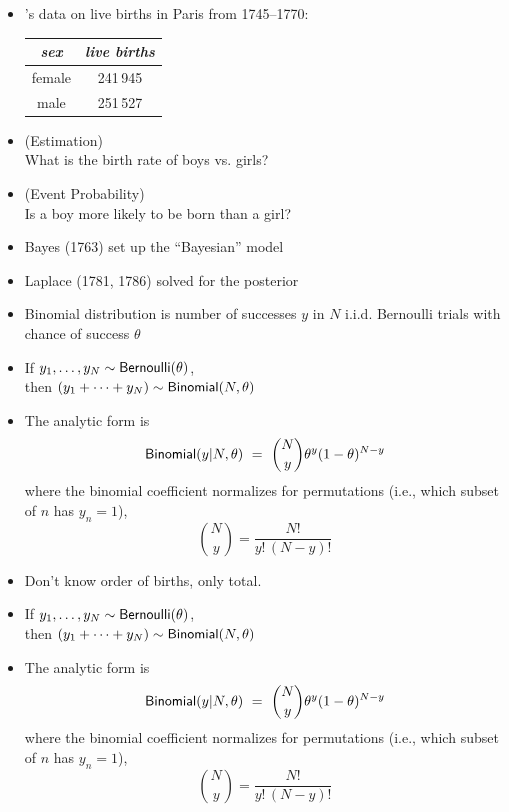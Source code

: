 \documentclass[10pt]{report}
\begin{document}


\begin{itemize}
\item {}'s data on live births in Paris from 1745--1770:
\vspace*{-4pt}
\begin{center}\small
\begin{tabular}{c|c}
{\slshape sex} & {\slshape live births}
\\ \hline
female & 241\,945
\\
male & 251\,527
\end{tabular}
\end{center}
\item {} (Estimation)
\\
What is the birth rate of boys vs. girls?

\item {} (Event Probability)
\\
Is a boy more likely to be born than a girl?
%
\item Bayes (1763) set up the ``Bayesian'' model
\item Laplace (1781, 1786) solved for the posterior
\end{itemize}


%
\begin{itemize}
\item Binomial distribution is number of successes $y$ in $N$ 
i.i.d. Bernoulli trials with chance of success $\theta$
\item If $y_1,\ldots,y_N\sim \text{\sf Bernoulli}(\theta)$, 
\\[4pt] then $(y_1 + \cdots + y_N) \sim \text{\sf Binomial}(N,\theta)$
\item The analytic form is
\[
\text{\sf Binomial}(y|N,\theta) 
\ = \ \binom{N}{y} \theta^{y} (1 - \theta)^{N-y}
\]
where the binomial coefficient normalizes for permutations (i.e.,
which subset of $n$ has $y_n = 1$),
\[
\binom{N}{y} = \frac{N!}{y! \, (N-y)!}
\]
\end{itemize}


%
\begin{itemize}
\item Don't know order of births, only total.
\item If $y_1,\ldots,y_N\sim \text{\sf Bernoulli}(\theta)$,
\\[4pt] then $(y_1 + \cdots + y_N) \sim \text{\sf Binomial}(N,\theta)$
\item The analytic form is
\[
\text{\sf Binomial}(y|N,\theta)
\ = \ \binom{N}{y} \theta^{y} (1 - \theta)^{N-y}
\]
where the binomial coefficient normalizes for permutations (i.e.,
which subset of $n$ has $y_n = 1$),
\[
\binom{N}{y} = \frac{N!}{y! \, (N-y)!}
\]
\end{itemize}
\end{document}
